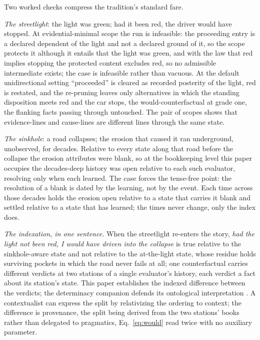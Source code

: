 Two worked checks compress the tradition's standard fare.

\emph{The streetlight}: the light was green; had it been red, the driver would have stopped. At evidential-minimal scope the run is infeasible: the proceeding entry is a declared dependent of the light and not a declared ground of it, so the scope protects it although it entails that the light was green, and with the law that red implies stopping the protected content excludes red, so no admissible intermediate exists; the case is infeasible rather than vacuous. At the default unidirectional setting ``proceeded'' is cleared as recorded posterity of the light, red is restated, and the re-pruning leaves only alternatives in which the standing disposition meets red and the car stops, the would-counterfactual at grade one, the flanking facts passing through untouched. The pair of scopes shows that evidence-lines and cause-lines are different lines through the same state.

\emph{The sinkhole}: a road collapses; the erosion that caused it ran underground, unobserved, for decades. Relative to every state along that road before the collapse the erosion attributes were blank, so at the bookkeeping level this paper occupies the decades-deep history was open relative to each such evaluator, resolving only when each learned. The case forces the tense-free point: the resolution of a blank is dated by the learning, not by the event. Each time across those decades holds the erosion open relative to a state that carries it blank and settled relative to a state that has learned; the times never change, only the index does.

\textit{The indexation, in one sentence.} When the streetlight re-enters the story, \emph{had the light not been red, I would have driven into the collapse} is true relative to the sinkhole-aware state and not relative to the at-the-light state, whose residue holds surviving pockets in which the road never fails at all; one counterfactual carries different verdicts at two stations of a single evaluator's history, each verdict a fact about its station's state. This paper establishes the indexed difference between the verdicts; the determinacy companion defends its ontological interpretation \parencite{AethusRealist}. A contextualist can express the split by relativizing the ordering to context; the difference is provenance, the split being derived from the two stations' books rather than delegated to pragmatics, Eq.~\eqref{eq:would} read twice with no auxiliary parameter.

